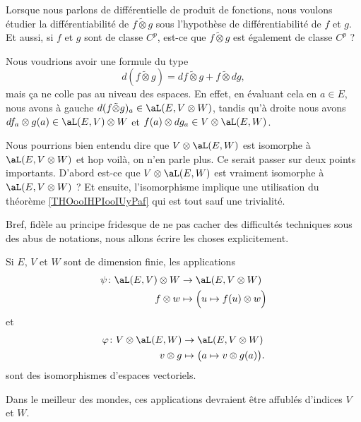 Lorsque nous parlons de différentielle de produit de fonctions, nous voulons étudier la différentiabilité de \( f\tilde\otimes g\) sous l'hypothèse de différentiabilité de \( f\) et \( g\). Et aussi, si \( f\) et \( g\) sont de classe \( C^p\), est-ce que \( f\tilde\otimes g\) est également de classe \( C^p\) ?

Nous voudrions avoir une formule du type
\begin{equation}
	d(f\tilde\otimes g)=df\tilde\otimes g+f\tilde\otimes dg,
\end{equation}
mais ça ne colle pas au niveau des espaces. En effet, en évaluant cela en \( a\in E\), nous avons à gauche \( d(f\tilde\otimes g)_a\in\aL(E,V\otimes W)\), tandis qu'à droite nous avons \( df_a\otimes g(a)\in \aL(E,V)\otimes W\) et \( f(a)\otimes dg_a\in V\otimes \aL(E,W)\).

Nous pourrions bien entendu dire que \( V\otimes \aL(E,W)\) est isomorphe à \( \aL(E,V\otimes W)\) et hop voilà, on n'en parle plus. Ce serait passer sur deux points importants. D'abord est-ce que \( V\otimes \aL(E,W)\) est vraiment isomorphe à \( \aL(E,V\otimes W)\) ? Et ensuite, l'isomorphisme implique une utilisation du théorème \ref{THOooIHPIooIUyPaf} qui est tout sauf une trivialité.

Bref, fidèle au principe fridesque de ne pas cacher des difficultés techniques sous des abus de notations, nous allons écrire les choses explicitement.

\begin{lemma}
	Si \( E\), \( V\) et \( W\) sont de dimension finie, les applications
	\begin{equation}        \label{EQooVWXRooCesUqH}
		\begin{aligned}
			\psi\colon \aL(E,V)\otimes W & \to \aL(E,V\otimes W)                      \\
			f\otimes w                   & \mapsto \Big( u\mapsto f(u)\otimes w \Big)
		\end{aligned}
	\end{equation}
	et
	\begin{equation}
		\begin{aligned}
			\varphi\colon V\otimes \aL(E,W) & \to \aL(E,V\otimes W)                       \\
			v\otimes g                      & \mapsto \big( a\mapsto v\otimes g(a) \big).
		\end{aligned}
	\end{equation}
	sont des isomorphismes d'espaces vectoriels.
\end{lemma}
Dans le meilleur des mondes, ces applications devraient être affublés d'indices \( V\) et \( W\).

